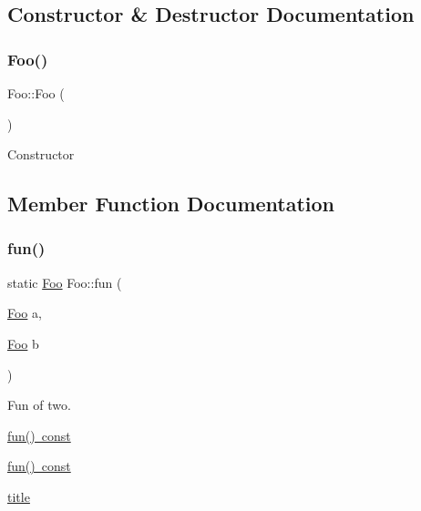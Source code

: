 \subsection{Constructor \& Destructor Documentation}
\mbox{\label{struct_foo_a5c036d1b3561a0e1beffe8c6799a4276}} 
\subsubsection{\texorpdfstring{Foo()}{Foo()}}
{\footnotesize\ttfamily Foo\+::\+Foo (\begin{DoxyParamCaption}{ }\end{DoxyParamCaption})}

Constructor 

\subsection{Member Function Documentation}
\mbox{\label{struct_foo_abdf64a71706807b0f946265902c530ee}} 
\subsubsection{\texorpdfstring{fun()}{fun()}}
{\footnotesize\ttfamily static \mbox{\hyperlink{struct_foo}{Foo}} Foo\+::fun (\begin{DoxyParamCaption}\item[{\mbox{\hyperlink{struct_foo}{Foo}}}]{a,  }\item[{\mbox{\hyperlink{struct_foo}{Foo}}}]{b }\end{DoxyParamCaption})\hspace{0.3cm}{\ttfamily [static]}}



Fun of two. 


\begin{DoxyItemize}
\item \mbox{\hyperlink{struct_foo_a978acd73e910ce56cc169ebec8736669}{fun() const}}
\item \mbox{\hyperlink{struct_foo_a978acd73e910ce56cc169ebec8736669}{fun() const}}
\item \mbox{\hyperlink{struct_foo_a978acd73e910ce56cc169ebec8736669}{title}} 
\end{DoxyItemize}\mbox{\label{struct_foo_aa20bd44b1bb87a652ac65170ddfa1a5a}} 
